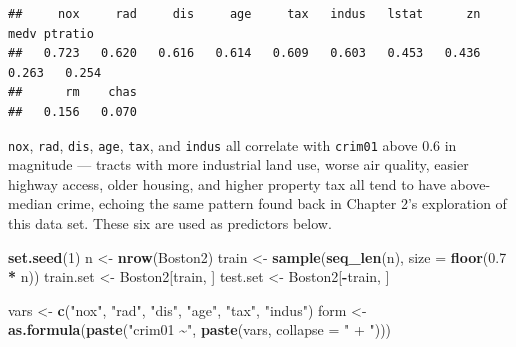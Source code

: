 \documentclass[
  11pt,
]{article}
\newenvironment{Shaded}{\begin{snugshade}}{\end{snugshade}}
\newcommand{\AttributeTok}[1]{\textcolor[rgb]{0.13,0.29,0.53}{#1}}
\newcommand{\ConstantTok}[1]{\textcolor[rgb]{0.56,0.35,0.01}{#1}}
\newcommand{\ControlFlowTok}[1]{\textcolor[rgb]{0.13,0.29,0.53}{\textbf{#1}}}
\newcommand{\DecValTok}[1]{\textcolor[rgb]{0.00,0.00,0.81}{#1}}
\newcommand{\FloatTok}[1]{\textcolor[rgb]{0.00,0.00,0.81}{#1}}
\newcommand{\FunctionTok}[1]{\textcolor[rgb]{0.13,0.29,0.53}{\textbf{#1}}}
\newcommand{\NormalTok}[1]{#1}
\newcommand{\OtherTok}[1]{\textcolor[rgb]{0.56,0.35,0.01}{#1}}
\newcommand{\SpecialCharTok}[1]{\textcolor[rgb]{0.81,0.36,0.00}{\textbf{#1}}}
\newcommand{\StringTok}[1]{\textcolor[rgb]{0.31,0.60,0.02}{#1}}
\begin{document}
\begin{Shaded}
\end{Shaded}

\begin{verbatim}
##     nox     rad     dis     age     tax   indus   lstat      zn    medv ptratio 
##   0.723   0.620   0.616   0.614   0.609   0.603   0.453   0.436   0.263   0.254 
##      rm    chas 
##   0.156   0.070
\end{verbatim}

\texttt{nox}, \texttt{rad}, \texttt{dis}, \texttt{age}, \texttt{tax},
and \texttt{indus} all correlate with \texttt{crim01} above 0.6 in
magnitude --- tracts with more industrial land use, worse air quality,
easier highway access, older housing, and higher property tax all tend
to have above-median crime, echoing the same pattern found back in
Chapter 2's exploration of this data set. These six are used as
predictors below.

\begin{Shaded}
\begin{Highlighting}[]
\FunctionTok{set.seed}\NormalTok{(}\DecValTok{1}\NormalTok{)}
\NormalTok{n }\OtherTok{\textless{}{-}} \FunctionTok{nrow}\NormalTok{(Boston2)}
\NormalTok{train }\OtherTok{\textless{}{-}} \FunctionTok{sample}\NormalTok{(}\FunctionTok{seq\_len}\NormalTok{(n), }\AttributeTok{size =} \FunctionTok{floor}\NormalTok{(}\FloatTok{0.7} \SpecialCharTok{*}\NormalTok{ n))}
\NormalTok{train.set }\OtherTok{\textless{}{-}}\NormalTok{ Boston2[train, ]}
\NormalTok{test.set }\OtherTok{\textless{}{-}}\NormalTok{ Boston2[}\SpecialCharTok{{-}}\NormalTok{train, ]}

\NormalTok{vars }\OtherTok{\textless{}{-}} \FunctionTok{c}\NormalTok{(}\StringTok{"nox"}\NormalTok{, }\StringTok{"rad"}\NormalTok{, }\StringTok{"dis"}\NormalTok{, }\StringTok{"age"}\NormalTok{, }\StringTok{"tax"}\NormalTok{, }\StringTok{"indus"}\NormalTok{)}
\NormalTok{form }\OtherTok{\textless{}{-}} \FunctionTok{as.formula}\NormalTok{(}\FunctionTok{paste}\NormalTok{(}\StringTok{"crim01 \textasciitilde{}"}\NormalTok{, }\FunctionTok{paste}\NormalTok{(vars, }\AttributeTok{collapse =} \StringTok{" + "}\NormalTok{)))}
\end{Highlighting}
\end{Shaded}
\end{document}
